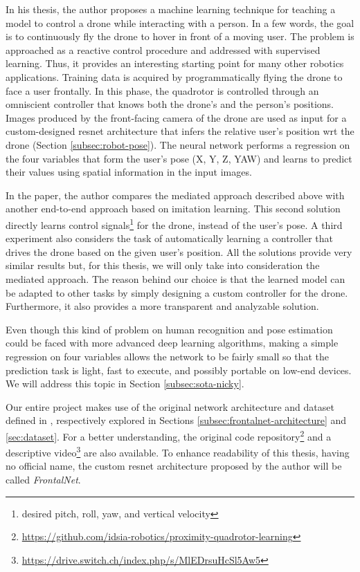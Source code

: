 In his thesis, the author proposes a machine learning technique for teaching a model to control a drone while interacting with a person. In a few words, the goal is to continuously fly the drone to hover in front of a moving user. The problem is approached as a reactive control procedure and addressed with supervised learning. Thus, it provides an interesting starting point for many other robotics applications. Training data is acquired by programmatically flying the drone to face a user frontally. In this phase, the quadrotor is controlled through an omniscient controller that knows both the drone's and the person's positions. Images produced by the front-facing camera of the drone are used as input for a custom-designed \gls{resnet} architecture that infers the relative user's position \gls{wrt} the drone (Section \ref{subsec:robot-pose}). The neural network performs a regression on the four variables that form the user's pose (X, Y, Z, YAW) and learns to predict their values using spatial information in the input images.

In the paper, the author compares the mediated approach described above with another end-to-end approach based on imitation learning. This second solution directly learns control signals\footnote{desired pitch, roll, yaw, and vertical velocity} for the drone, instead of the user's pose. A third experiment also considers the task of automatically learning a controller that drives the drone based on the given user's position. All the solutions provide very similar results but, for this thesis, we will only take into consideration the mediated approach. The reason behind our choice is that the learned model can be adapted to other tasks by simply designing a custom controller for the drone. Furthermore, it also provides a more transparent and analyzable solution.

Even though this kind of problem on human recognition and pose estimation could be faced with more advanced deep learning algorithms, making a simple regression on four variables allows the network to be fairly small so that the prediction task is light, fast to execute, and possibly portable on low-end devices. We will address this topic in Section \ref{subsec:sota-nicky}.

\medskip

Our entire project makes use of the original network architecture and dataset defined in \cite{mantegazza2019visionbased}, respectively explored in Sections \ref{subsec:frontalnet-architecture} and \ref{sec:dataset}. For a better understanding, the original code repository\footnote{\url{https://github.com/idsia-robotics/proximity-quadrotor-learning}} and a descriptive video\footnote{\url{https://drive.switch.ch/index.php/s/MlEDrsuHcSl5Aw5}} are also available. To enhance readability of this thesis, having no official name, the custom \gls{resnet} architecture proposed by the author will be called \textit{FrontalNet}.



